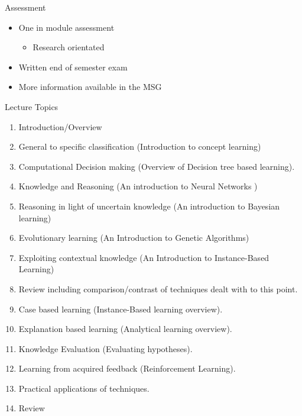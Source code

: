 \documentclass[%
pdf,
colorBG,
slideColor,
tcrico,
]{prosper}
\begin{document}


\begin{slide}{Assessment}
\begin{itemize}
\item One in module assessment
	\begin{itemize}
	\item Research orientated 
	\end{itemize}
\item Written end of semester exam 
\item More information available in the MSG
\end{itemize}
\end{slide}




\begin{slide}{Lecture Topics}
\tiny
\begin{enumerate}
 \item Introduction/Overview
\item General to specific classification (Introduction to concept learning)
\item Computational Decision making (Overview of Decision tree based learning).
\item Knowledge and Reasoning (An introduction to Neural Networks )
\item Reasoning in light of uncertain knowledge (An introduction to Bayesian learning)
\item Evolutionary learning (An Introduction to Genetic Algorithms)
\item Exploiting contextual knowledge (An Introduction to Instance-Based Learning)
\item Review including comparison/contrast of techniques dealt with to this point.
\item Case based learning (Instance-Based learning overview).
\item Explanation based learning (Analytical learning overview).
\item Knowledge Evaluation (Evaluating hypotheses).
\item Learning from acquired feedback (Reinforcement Learning).
\item Practical applications of techniques.
\item Review
\end{enumerate}
\end{slide}

\end{document}
